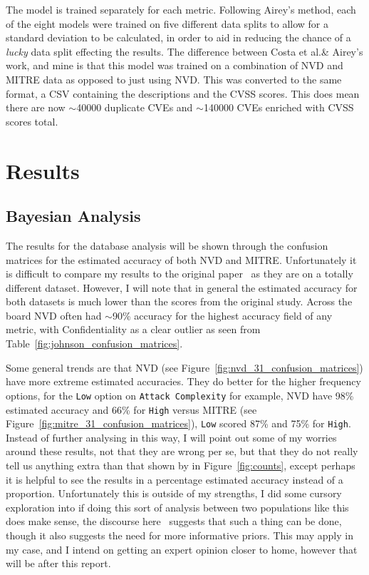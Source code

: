 \documentclass[12pt]{article}
\begin{document}
The model is trained separately for each metric. Following Airey's method, each of the eight models
were trained on five different data splits to allow for a standard deviation to be calculated, in
order to aid in reducing the chance of a \textit{lucky} data split effecting the results. The
difference between Costa et al.\@ \& Airey's work, and mine is that this model was trained on a
combination of NVD and MITRE data as opposed to just using NVD. This was converted to the same
format, a CSV containing the descriptions and the CVSS scores. This does mean there are now
$\sim$40000 duplicate CVEs and $\sim$140000 CVEs enriched with CVSS scores total.

\section{Results}

\subsection{Bayesian Analysis}

The results for the database analysis will be shown through the confusion matrices for the estimated
accuracy of both NVD and MITRE. Unfortunately it is difficult to compare my results to the original
paper~\cite{bayes} as they are on a totally different dataset. However, I will note that in general the estimated
accuracy for both datasets is much lower than the scores from the original study. Across the board NVD
often had $\sim$90\% accuracy for the highest accuracy field of any metric, with Confidentiality as
a clear outlier as seen from Table~\ref{fig:johnson_confusion_matrices}.

Some general trends are that NVD (see Figure~\ref{fig:nvd_31_confusion_matrices}) have more extreme
estimated accuracies. They do better for the higher frequency options, for the \texttt{Low} option
on \texttt{Attack Complexity} for example, NVD have 98\% estimated accuracy and 66\% for
\texttt{High} versus MITRE (see Figure~\ref{fig:mitre_31_confusion_matrices}), \texttt{Low} scored
87\% and 75\% for \texttt{High}. Instead of further analysing in this way, I will point out some of
my worries around these results, not that they are wrong per se, but that they do not really tell us
anything extra than that shown by in Figure~\ref{fig:counts}, except perhaps it is helpful to see
the results in a percentage estimated accuracy instead of a proportion. Unfortunately this is
outside of my strengths, I did some cursory exploration into if doing this sort of analysis
between two populations like this does make sense, the discourse here~\cite{stat_modeling} suggests
that such a thing can be done, though it also suggests the need for more informative priors. This
may apply in my case, and I intend on getting an expert opinion closer to home, however that will be
after this report.
\end{document}
